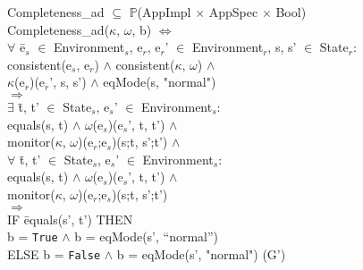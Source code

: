 \documentclass[conference]{IEEEtran}
\begin{document}
\begin{tabbing}
Completeness\_ad $\subseteq$ $\mathbb{P}$(AppImpl $\times$ AppSpec $\times$ Bool)
\\Completeness\_ad($\kappa$, $\omega$, b) $\Leftrightarrow$
\\$\forall$ \=e$_s$ $\in$ Environment$_s$, e$_r$, e$_r$' $\in$ Environment$_r$, s, s' $\in$ State$_r$:
\\\>consistent(e$_s$, e$_r$) $\wedge$ consistent($\kappa$, $\omega$) $\wedge$ 
\\\>\textlbrackdbl $\kappa$\textrbrackdbl(e$_r$)(e$_r$', s, s') $\wedge$ eqMode(s, "normal")
\\$\Rightarrow$
\\\>$\exists$ \=t, t' $\in$ State$_s$, e$_s$' $\in$ Environment$_s$: 
\\\>\>equals(s, t) $\wedge$ \textlbrackdbl $\omega$\textrbrackdbl(e$_s$)(e$_s$', t, t') $\wedge$ 
\\\>\>monitor($\kappa$, $\omega$)(e$_r$;e$_s$)(s;t, s';t')
$\wedge$
\\\>$\forall$ \=t, t' $\in$ State$_s$, e$_s$' $\in$ Environment$_s$: 
\\\>\>equals(s, t) $\wedge$ \textlbrackdbl $\omega$\textrbrackdbl(e$_s$)(e$_s$', t, t') $\wedge$ 
\\\>\>monitor($\kappa$, $\omega$)(e$_r$;e$_s$)(s;t, s';t')
\\\>$\Rightarrow$ \=
\\\>\>IF \=equals(s', t')  THEN 
\\\>\>\> b = \texttt{True} $\wedge$ b = eqMode(s', ``normal'')
\\\>\>ELSE b = \texttt{False} $\wedge$ b = eqMode(s', "normal")   \hspace*{0.5cm} (G')
\end{tabbing}
\end{document}
